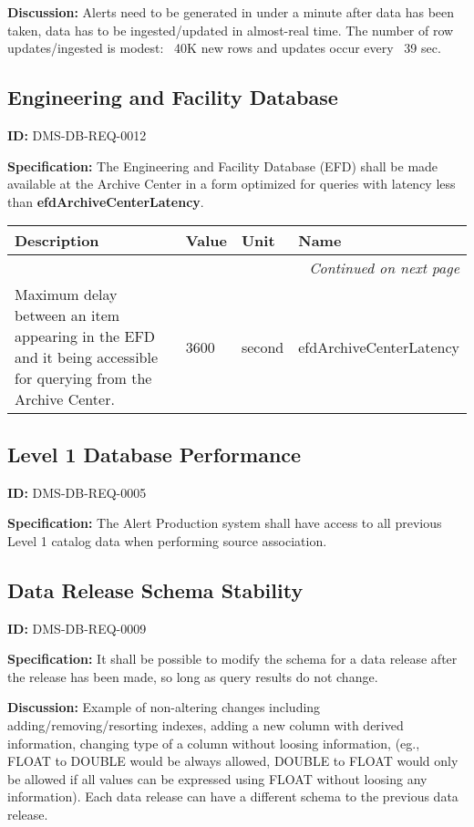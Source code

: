 \documentclass[SE,toc,lsstdraft]{lsstdoc}
\makeatletter
\newcommand{\paramname}[1]{\hspace{0pt}#1}
\newcommand{\unitname}[1]{\hspace{0pt}#1}
\newenvironment{parameters}[0]{%
\setlength\LTleft{0pt}
\setlength\LTright{\fill}
\begin{small}
\begin{longtable}[]{|p{0.49\textwidth}|l|p{0.6in}|p{1.70in}@{}|}

\hline \textbf{Description} & \textbf{Value} & \textbf{Unit} & \textbf{Name} \\ \hline
\endhead

\hline \multicolumn{4}{r}{\emph{Continued on next page}} \\
\endfoot

\hline\hline
\endlastfoot
}{%
\hline
\end{longtable}
\end{small}
}
\makeatother
\begin{document}
\textbf{Discussion:}
Alerts need to be generated in under a minute after data has been taken, data has to be ingested/updated in almost-real time. The number of row updates/ingested is modest: ~40K new rows and updates occur every ~39 sec.

\subsection{Engineering and Facility Database}

\label{DMS-DB-REQ-0012}
\textbf{ID:} DMS-DB-REQ-0012

\textbf{Specification:}
The Engineering and Facility Database (EFD) shall be made available at the Archive Center in a form optimized for queries with latency less than \textbf{efdArchiveCenterLatency}.

\begin{parameters}
Maximum delay between an item appearing in the EFD and it being accessible for querying from the Archive Center.
&
3600
&
\unitname{%
second
}
&
\paramname{%
efdArchiveCenterLatency
} \\\hline
\end{parameters}

\subsection{Level 1 Database Performance}

\label{DMS-DB-REQ-0005}
\textbf{ID:} DMS-DB-REQ-0005

\textbf{Specification:}
The Alert Production system shall have access to all previous Level 1 catalog data when performing source association.

\subsection{Data Release Schema Stability}

\label{DMS-DB-REQ-0009}
\textbf{ID:} DMS-DB-REQ-0009

\textbf{Specification:}
It shall be possible to modify the schema for a data release after the release has been made, so long as query results do not change.

\textbf{Discussion:}
Example of non-altering changes including adding/removing/resorting indexes, adding a new column with derived information, changing type of a column without loosing information, (eg., FLOAT to DOUBLE would be always allowed, DOUBLE to FLOAT would only be allowed if all values can be expressed using FLOAT without loosing any information). Each data release can have a different schema to the previous data release.
\end{document}
